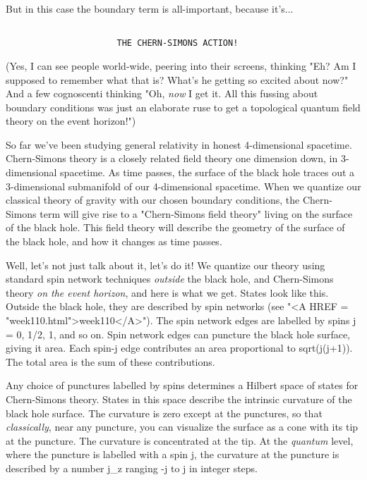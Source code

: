 But in this case the boundary term is all-important, because it's...


\begin{verbatim}

                      THE CHERN-SIMONS ACTION!
\end{verbatim}
    
(Yes, I can see people world-wide, peering into their screens, thinking
"Eh?  Am I supposed to remember what that is?  What's he getting so
excited about now?"  And a few cognoscenti thinking "Oh, \emph{now} I get it.
All this fussing about boundary conditions was just an elaborate ruse to
get a topological quantum field theory on the event horizon!")

So far we've been studying general relativity in honest 4-dimensional
spacetime.  Chern-Simons theory is a closely related field theory one
dimension down, in 3-dimensional spacetime.  As time passes, the surface
of the black hole traces out a 3-dimensional submanifold of our
4-dimensional spacetime.  When we quantize our classical theory of
gravity with our chosen boundary conditions, the Chern-Simons term will
give rise to a "Chern-Simons field theory" living on the surface of the
black hole.  This field theory will describe the geometry of the surface
of the black hole, and how it changes as time passes.

Well, let's not just talk about it, let's do it!  We quantize our theory
using standard spin network techniques \emph{outside} the black hole, and
Chern-Simons theory \emph{on the event horizon}, and here is what we get.
States look like this.  Outside the black hole, they are described by
spin networks (see "<A HREF = "week110.html">week110</A>").  The spin network edges are labelled by
spins j = 0, 1/2, 1, and so on.  Spin network edges can puncture the
black hole surface, giving it area.  Each spin-j edge contributes
an area proportional to sqrt(j(j+1)).  The total area is the sum of
these contributions.

Any choice of punctures labelled by spins determines a Hilbert space of
states for Chern-Simons theory.  States in this space describe the
intrinsic curvature of the black hole surface.  The curvature is zero
except at the punctures, so that \emph{classically}, near any puncture, you
can visualize the surface as a cone with its tip at the puncture.  The
curvature is concentrated at the tip.  At the \emph{quantum} level, where the
puncture is labelled with a spin j, the curvature at the puncture is
described by a number j_{z} ranging -j to j in integer steps.


